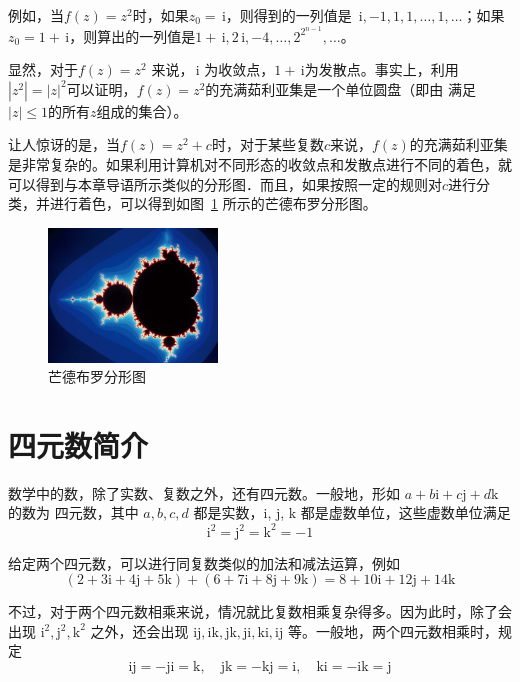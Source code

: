 \documentclass[a4paper,openany]{ctexbook}
\newcommand{\ii}{\,\mathrm{i}}
\begin{document}
例如，当\(f(z)=z^2\)时，如果\(z_0=\ii\)，则得到的一列值是 \(\ii,-1,1,1,\dots,1,\dots\)；如果 \(z_0=1+\ii\)，则算出的一列值是\(1+\ii,2\ii,-4,\dots,2^{2^{n-1}},\dots\)。

显然，对于\(f(z)=z^2\) 来说，\(\ii\) 为收敛点，\(1+\ii\)为发散点。事实上，利用\(|z^2|=|z|^2\)可以证明，\(f(z)=z^2\)的充满茹利亚集是一个单位圆盘（即由
满足\(|z|\le 1\)的所有\(z\)组成的集合）。

让人惊讶的是，当\(f(z)=z^2+c\)时，对于某些复数\(c\)来说，\(f(z)\)的充满茹利亚集是非常复杂的。如果利用计算机对不同形态的收敛点和发散点进行不同的着色，就
可以得到与本章导语所示类似的分形图．而且，如果按照一定的规则对\(c\)进行分类，并进行着色，可以得到如图~\ref{fgr:mhdebuloffxktu} 所示的芒德布罗分形图。

\begin{figure}
    \centering
    \includegraphics[width=0.4\textwidth]{image6.png}
    \caption{芒德布罗分形图}\label{fgr:mhdebuloffxktu}
\end{figure}

\section{四元数简介}

数学中的数，除了实数、复数之外，还有四元数。一般地，形如 \( a + b\mathrm{i} + c\mathrm{j} + d\mathrm{k} \) 的数为
四元数，其中 \( a, b, c, d \) 都是实数，$\mathrm{i}$, $\mathrm{j}$, $\mathrm{k}$ 都是虚数单位，这些虚数单位满足
\[ \mathrm{i}^2 = \mathrm{j}^2 = \mathrm{k}^2 = -1 \]

给定两个四元数，可以进行同复数类似的加法和减法运算，例如
\[ (2 + 3\mathrm{i} + 4\mathrm{j} + 5\mathrm{k}) + (6 + 7\mathrm{i} + 8\mathrm{j} + 9\mathrm{k}) = 8 + 10\mathrm{i} + 12\mathrm{j} + 14\mathrm{k}\]

不过，对于两个四元数相乘来说，情况就比复数相乘复杂得多。因为此时，除了会出现 \( \mathrm{i}^2, \mathrm{j}^2,
\mathrm{k}^2 \) 之外，还会出现 \( \mathrm{i}\mathrm{j}, \mathrm{i}\mathrm{k}, \mathrm{j}\mathrm{k},
\mathrm{j}\mathrm{i}, \mathrm{k}\mathrm{i}, \mathrm{i}\mathrm{j} \) 等。一般地，两个四元数相乘时，规定
\[
    \mathrm{i}\mathrm{j} = -\mathrm{j}\mathrm{i} = \mathrm{k},
    \quad
    \mathrm{j}\mathrm{k} = -\mathrm{k}\mathrm{j} = \mathrm{i},
    \quad
    \mathrm{k}\mathrm{i} = -\mathrm{i}\mathrm{k} = \mathrm{j}
\]
\end{document}
